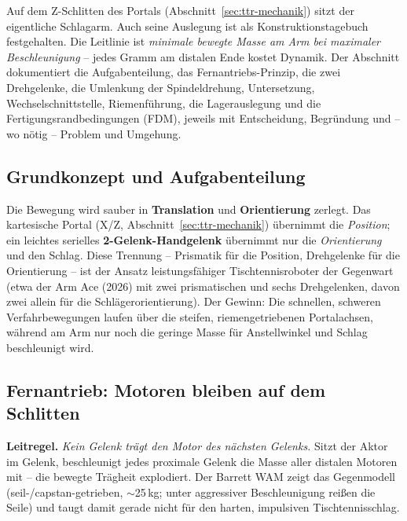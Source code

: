 Auf dem Z-Schlitten des Portals (Abschnitt~\ref{sec:ttr-mechanik}) sitzt der
eigentliche Schlagarm. Auch seine Auslegung ist als Konstruktionstagebuch
festgehalten. Die Leitlinie ist \emph{minimale bewegte Masse am Arm bei maximaler
Beschleunigung} -- jedes Gramm am distalen Ende kostet Dynamik. Der Abschnitt
dokumentiert die Aufgabenteilung, das Fernantriebs-Prinzip, die zwei Drehgelenke,
die Umlenkung der Spindeldrehung, Untersetzung, Wechselschnittstelle,
Riemenf\"uhrung, die Lagerauslegung und die Fertigungsrandbedingungen (FDM),
jeweils mit Entscheidung, Begr\"undung und -- wo n\"otig -- Problem und Umgehung.

\subsection{Grundkonzept und Aufgabenteilung}
\label{sec:ttr-arm-konzept}

Die Bewegung wird sauber in \textbf{Translation} und \textbf{Orientierung}
zerlegt. Das kartesische Portal (X/Z, Abschnitt~\ref{sec:ttr-mechanik})
\"ubernimmt die \emph{Position}; ein leichtes serielles
\textbf{2-Gelenk-Handgelenk} \"ubernimmt nur die \emph{Orientierung} und den
Schlag. Diese Trennung -- Prismatik f\"ur die Position, Drehgelenke f\"ur die
Orientierung -- ist der Ansatz leistungsf\"ahiger Tischtennisroboter der Gegenwart
(etwa der Arm \glqq Ace\grqq{} (2026) mit zwei prismatischen und sechs
Drehgelenken, davon zwei allein f\"ur die Schl\"agerorientierung). Der Gewinn: Die
schnellen, schweren Verfahrbewegungen laufen \"uber die steifen, riemengetriebenen
Portalachsen, w\"ahrend am Arm nur noch die geringe Masse f\"ur Anstellwinkel und
Schlag beschleunigt wird.

\subsection{Fernantrieb: Motoren bleiben auf dem Schlitten}
\label{sec:ttr-arm-fern}

\textbf{Leitregel.} \emph{Kein Gelenk tr\"agt den Motor des n\"achsten Gelenks.}
Sitzt der Aktor im Gelenk, beschleunigt jedes proximale Gelenk die Masse aller
distalen Motoren mit -- die bewegte Tr\"agheit explodiert. Der Barrett WAM zeigt
das Gegenmodell (seil-/capstan-getrieben, $\sim$25\,kg; unter aggressiver
Beschleunigung rei\ss en die Seile) und taugt damit gerade nicht f\"ur den harten,
impulsiven Tischtennisschlag.

